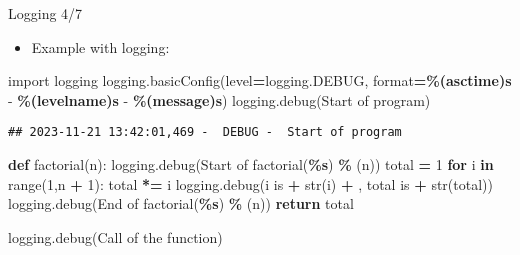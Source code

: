 \documentclass[
  8pt,
  ignorenonframetext,
]{beamer}
\newenvironment{Shaded}{\begin{snugshade}}{\end{snugshade}}
\newcommand{\BuiltInTok}[1]{#1}
\newcommand{\ControlFlowTok}[1]{\textcolor[rgb]{0.13,0.29,0.53}{\textbf{#1}}}
\newcommand{\DecValTok}[1]{\textcolor[rgb]{0.00,0.00,0.81}{#1}}
\newcommand{\ImportTok}[1]{#1}
\newcommand{\KeywordTok}[1]{\textcolor[rgb]{0.13,0.29,0.53}{\textbf{#1}}}
\newcommand{\NormalTok}[1]{#1}
\newcommand{\OperatorTok}[1]{\textcolor[rgb]{0.81,0.36,0.00}{\textbf{#1}}}
\newcommand{\SpecialCharTok}[1]{\textcolor[rgb]{0.81,0.36,0.00}{\textbf{#1}}}
\newcommand{\StringTok}[1]{\textcolor[rgb]{0.31,0.60,0.02}{#1}}
\providecommand{\tightlist}{%
  \setlength{\itemsep}{0pt}\setlength{\parskip}{0pt}}
\begin{document}
\begin{frame}[fragile]{Logging 4/7}
\protect\hypertarget{logging-47}{}
\begin{itemize}
\tightlist
\item
  Example with logging:
\end{itemize}

\begin{Shaded}
\begin{Highlighting}[]
\ImportTok{import}\NormalTok{ logging}
\NormalTok{logging.basicConfig(level}\OperatorTok{=}\NormalTok{logging.DEBUG, }\BuiltInTok{format}\OperatorTok{=}\StringTok{\textquotesingle{}}\SpecialCharTok{\%(asctime)s}\StringTok{ {-}  }\SpecialCharTok{\%(levelname)s}\StringTok{ {-}  }\SpecialCharTok{\%(message)s}\StringTok{\textquotesingle{}}\NormalTok{)}
\NormalTok{logging.debug(}\StringTok{\textquotesingle{}Start of program\textquotesingle{}}\NormalTok{)}
\end{Highlighting}
\end{Shaded}

\begin{verbatim}
## 2023-11-21 13:42:01,469 -  DEBUG -  Start of program
\end{verbatim}

\begin{Shaded}
\begin{Highlighting}[]
\KeywordTok{def}\NormalTok{ factorial(n):}
\NormalTok{    logging.debug(}\StringTok{\textquotesingle{}Start of factorial(}\SpecialCharTok{\%s}\StringTok{)\textquotesingle{}}  \OperatorTok{\%}\NormalTok{ (n))}
\NormalTok{    total }\OperatorTok{=} \DecValTok{1}
    \ControlFlowTok{for}\NormalTok{ i }\KeywordTok{in} \BuiltInTok{range}\NormalTok{(}\DecValTok{1}\NormalTok{,n }\OperatorTok{+} \DecValTok{1}\NormalTok{):}
\NormalTok{        total }\OperatorTok{*=}\NormalTok{ i}
\NormalTok{        logging.debug(}\StringTok{\textquotesingle{}i is \textquotesingle{}} \OperatorTok{+} \BuiltInTok{str}\NormalTok{(i) }\OperatorTok{+} \StringTok{\textquotesingle{}, total is \textquotesingle{}} \OperatorTok{+} \BuiltInTok{str}\NormalTok{(total))}
\NormalTok{    logging.debug(}\StringTok{\textquotesingle{}End of factorial(}\SpecialCharTok{\%s}\StringTok{)\textquotesingle{}}  \OperatorTok{\%}\NormalTok{ (n))}
    \ControlFlowTok{return}\NormalTok{ total}

\NormalTok{logging.debug(}\StringTok{\textquotesingle{}Call of the function\textquotesingle{}}\NormalTok{)}
\end{Highlighting}
\end{Shaded}


\end{frame}
\end{document}
